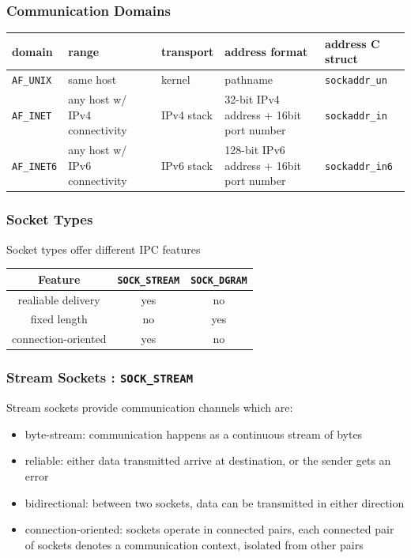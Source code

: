 \documentclass[newPxFont,sthlmFooter,nooffset]{beamer}
\begin{document}
\begin{frame}[t, fragile]
  \frametitle{Communication Domains}
  \begin{table}
    \centering
    \begin{tabular}{m{1.5cm} | m{2cm} | m{2cm} | m{2cm} | m{2cm}}
      domain & range & transport & address format & address C struct \\ \hline
      \texttt{AF\_UNIX} & same host & kernel & pathname & \texttt{sockaddr\_un} \\ \hline
      \texttt{AF\_INET} & any host w/ IPv4 connectivity & IPv4 stack & 32-bit IPv4 address + 16bit port number & \texttt{sockaddr\_in} \\ \hline
      \texttt{AF\_INET6} & any host w/ IPv6 connectivity & IPv6 stack & 128-bit IPv6 address + 16bit port number  & \texttt{sockaddr\_in6} \\
    \end{tabular}
  \end{table}

\end{frame}


\begin{frame}[t, fragile]
  \frametitle{Socket Types}
Socket types offer different IPC features

\begin{table}
  \centering
  \begin{tabular}{c | c | c}
    Feature & \texttt{SOCK\_STREAM} & \texttt{SOCK\_DGRAM} \\ \hline
    realiable delivery & yes & no \\ \hline
    fixed length & no & yes \\ \hline
    connection-oriented & yes & no \\
  \end{tabular}
\end{table}
\end{frame}


\begin{frame}[t, fragile]
  \frametitle{Stream Sockets : \texttt{SOCK\_STREAM}}
Stream sockets provide communication channels which are:
\begin{itemize}
\item byte-stream: communication happens as a continuous stream of bytes
\item reliable: either data transmitted arrive at destination, or the sender gets an error
\item bidirectional: between two sockets, data can be transmitted in either direction
\item connection-oriented: sockets operate in connected pairs, each connected pair of sockets denotes a communication context, isolated from other pairs
\end{itemize}

\end{frame}
\end{document}
